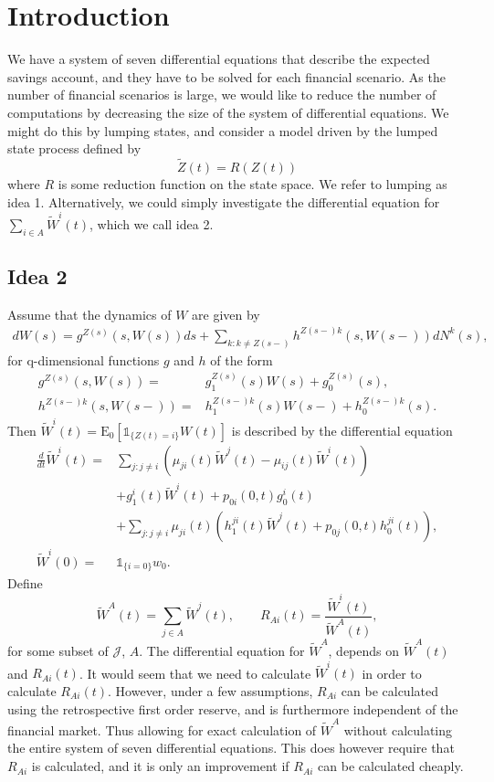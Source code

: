 \documentclass[12pt]{article}
\newcommand{\E}{\text{E}}
\newcommand{\indic}[1]{\mathds{1}_{ \{ #1 \} }}
\theoremstyle{my_thm}
\begin{document}
\section*{Introduction}
We have a system of seven differential equations that describe the expected savings account, and they have to be solved for each financial scenario. As the number of financial scenarios is large, we would like to reduce the number of computations by decreasing the size of the system of differential equations. We might do this by lumping states, and consider a model driven by the lumped state process defined by
$$
\tilde{Z}(t)=R(Z(t))
$$
where $R$ is some reduction function on the state space. We refer to lumping as idea 1. Alternatively, we could simply investigate the differential equation for $\sum_{i \in A} \tilde{W}^i(t)$, which we call idea 2.
\subsection*{Idea 2}
Assume that the dynamics of $W$ are given by
\begin{align*}
dW(s)=  g^{Z(s)}(s,W(s))ds+
 \sum_{k:k \neq Z(s-)} h^{Z(s-)k}(s,W(s-)) dN^k(s),
\end{align*}
for q-dimensional functions $g$ and $h$ of the form
\begin{align*}
g^{Z(s)}(s,W(s))=&g^{Z(s)}_1(s) W(s)+g_0^{Z(s)}(s),
\\
h^{Z(s-)k}(s,W(s-))=&h_1^{Z(s-)k}(s) W(s-)+h_0^{Z(s-)k}(s).
\end{align*}
Then $\tilde{W}^i(t)=\E_0[\indic{Z(t)=i}W(t)]$ is described by the differential equation
\begin{align}
\frac{d}{dt}\tilde{W}^i(t)=&
\sum_{j:j \neq i} \left( \mu_{ji}(t) \tilde{W}^j(t)-\mu_{ij}(t)\tilde{W}^i(t) \right)
 \label{eq:AAH} \\
&+
 g_1^i(t)\tilde{W}^i(t)+p_{0i}(0,t)g_0^i(t)
 \label{eq:AAI}\\
&+
\sum_{j:j\neq i} \mu_{ji}(t) \left(  h_1^{ji}(t) \tilde{W}^j(t) + p_{0j}(0,t)h_0^{ji}(t)\right) ,\label{eq:AAF}
\\
\tilde{W}^i(0)=&\indic{i=0}w_0 .\label{eq:AAG}
\end{align}
Define
$$
\tilde{W}^A(t)=\sum_{j \in A} \tilde{W}^j(t), \qquad R_{Ai}(t)=\frac{\tilde{W}^i(t)}{\tilde{W}^A(t)},
$$
for some subset of $\mathcal{J}$, $A$. The differential equation for $\tilde{W}^A$, depends on $\tilde{W}^A(t)$ and $R_{Ai}(t)$. It would seem that we need to calculate $\tilde{W}^i(t)$ in order to calculate $R_{Ai}(t)$. However, under a few assumptions, $R_{Ai}$ can be calculated using the retrospective first order reserve, and is furthermore independent of the financial market. Thus allowing for exact calculation of $\tilde{W}^A$ without calculating the entire system of seven differential equations. This does however require that $R_{Ai}$ is calculated, and it is only an improvement if $R_{Ai}$ can be calculated cheaply.
\end{document}
